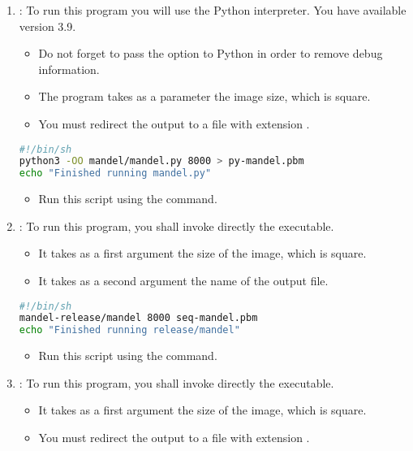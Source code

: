 \begin{enumerate}
  \item {}: 
        To run this program you will use the Python interpreter.
        You have available version 3.9.

    \begin{itemize}
      \item Do not forget to pass the option  to Python in order
            to remove debug information.
      \item The program takes as a parameter the image size, which is square.
      \item You must redirect the output to a file with extension .
    \end{itemize}

\begin{lstlisting}[language=bash,title={File: runpy.sh},frame=single]
#!/bin/sh
python3 -OO mandel/mandel.py 8000 > py-mandel.pbm
echo "Finished running mandel.py"
\end{lstlisting}

    \begin{itemize}
      \item Run this script using the  command.
    \end{itemize}

  \item {}: 
        To run this program, you shall invoke directly the executable.
    \begin{itemize}
      \item It takes as a first argument the size of the image, which is square.
      \item It takes as a second argument the name of the output file.
    \end{itemize}

\begin{lstlisting}[language=bash,title={File: run-seq-mandel.sh},frame=single]
#!/bin/sh
mandel-release/mandel 8000 seq-mandel.pbm
echo "Finished running release/mandel"
\end{lstlisting}
    \begin{itemize}
      \item Run this script using the  command.
    \end{itemize}

  \item {}: 
        To run this program, you shall invoke directly the executable.
    \begin{itemize}
      \item It takes as a first argument the size of the image, which is square.
      \item You must redirect the output to a file with extension .
    \end{itemize}


\end{enumerate}
